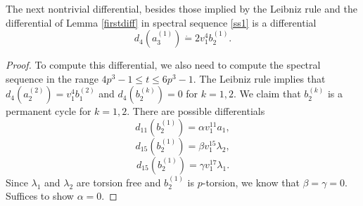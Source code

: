 \begin{lem}
The next nontrivial differential, besides those implied by the Leibniz rule and the differential of Lemma \ref{firstdiff} in spectral sequence \ref{ss1} is a differential 
\[ d_{4}(a_3^{(1)})\dot{=}2v_1^4b_2^{(1)}.\]
\end{lem}
\begin{proof}
To compute this differential, we also need to compute the spectral sequence in the range $4p^3-1\le t\le 6p^3-1$. The Leibniz rule implies that $d_{4}(a_2^{(2)})=v_1^4b_1^{(2)}$ and $d_4(b_2^{(k)})=0$ for $k=1,2$. We claim that $b_{2}^{(k)}$ is a permanent cycle for $k=1,2$. There are possible differentials 
\[ d_{11}(b_{2}^{(1)})=\alpha v_1^{11}a_1, \]
\[d_{15}(b_{2}^{(1)})=\beta v_1^{15}\lambda_2,\]
\[d_{15}(b_{2}^{(1)})=\gamma v_1^{17}\lambda_1.\]
Since $\lambda_1$ and $\lambda_2$ are torsion free and $b_{2}^{(1)}$ is $p$-torsion, we know that $\beta=\gamma=0$. Suffices to show $\alpha=0$. 
\end{proof}




